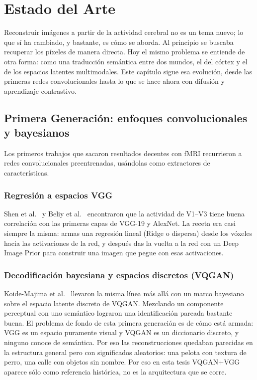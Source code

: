 \chapter{Estado del Arte}

Reconstruir imágenes a partir de la actividad cerebral no es un tema nuevo; lo que sí ha 
cambiado, y bastante, es cómo se aborda. Al principio se buscaba recuperar los píxeles de 
manera directa. Hoy el mismo problema se entiende de otra forma: como una traducción semántica 
entre dos mundos, el del córtex y el de los espacios latentes multimodales. Este capítulo 
sigue esa evolución, desde las primeras redes convolucionales hasta lo que se hace ahora con 
difusión y aprendizaje contrastivo.

\section{Primera Generación: enfoques convolucionales y bayesianos}

Los primeros trabajos que sacaron resultados decentes con fMRI recurrieron a redes 
convolucionales preentrenadas, usándolas como extractores de características.

\subsection{Regresión a espacios VGG}

Shen et al.~\cite{shen2019deep} y Beliy et al.~\cite{beliy2019voxels} encontraron que la 
actividad de V1–V3 tiene buena correlación con las primeras capas de VGG-19 y AlexNet. 
La receta era casi siempre la misma: armas una regresión lineal (Ridge o dispersa) desde los
vóxeles hacia las activaciones de la red, y después das la vuelta a la red con un
Deep Image Prior para construir una imagen que pegue con esas activaciones.

\subsection{Decodificación bayesiana y espacios discretos (VQGAN)}

Koide-Majima et al.~\cite{koidemajima2024} llevaron la misma línea más allá con un marco
bayesiano sobre el espacio latente discreto de VQGAN. Mezclando un componente perceptual 
con uno semántico lograron una identificación pareada bastante buena.
El problema de fondo de esta primera generación es de cómo está armada:
VGG es un espacio puramente visual y VQGAN es un diccionario discreto, y
ninguno conoce de semántica. Por eso las reconstrucciones quedaban parecidas
en la estructura general pero con significados aleatorios: una pelota con textura
de perro, una calle con objetos sin nombre. Por eso en esta tesis VQGAN+VGG
aparece sólo como referencia histórica, no es la arquitectura que se corre.

